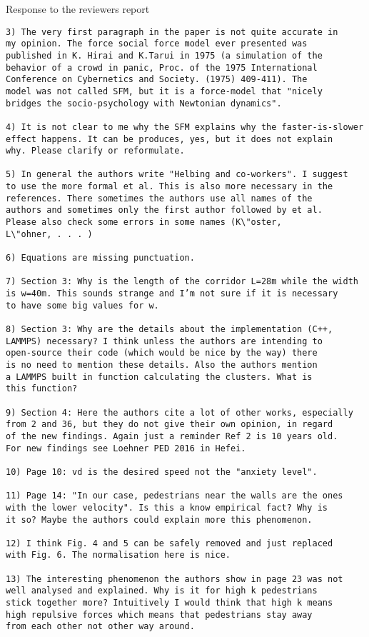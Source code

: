 \documentclass[a4paper,12pt]{letter}
\begin{document}
\begin{letter}{Response to the reviewers report}
\begin{verbatim}
3) The very first paragraph in the paper is not quite accurate in 
my opinion. The force social force model ever presented was 
published in K. Hirai and K.Tarui in 1975 (a simulation of the 
behavior of a crowd in panic, Proc. of the 1975 International 
Conference on Cybernetics and Society. (1975) 409-411). The 
model was not called SFM, but it is a force-model that "nicely 
bridges the socio-psychology with Newtonian dynamics".

4) It is not clear to me why the SFM explains why the faster-is-slower 
effect happens. It can be produces, yes, but it does not explain 
why. Please clarify or reformulate.

5) In general the authors write "Helbing and co-workers". I suggest 
to use the more formal et al. This is also more necessary in the 
references. There sometimes the authors use all names of the 
authors and sometimes only the first author followed by et al. 
Please also check some errors in some names (K\"oster, 
L\"ohner, . . . )

6) Equations are missing punctuation.

7) Section 3: Why is the length of the corridor L=28m while the width 
is w=40m. This sounds strange and I’m not sure if it is necessary 
to have some big values for w.

8) Section 3: Why are the details about the implementation (C++, 
LAMMPS) necessary? I think unless the authors are intending to 
open-source their code (which would be nice by the way) there 
is no need to mention these details. Also the authors mention 
a LAMMPS built in function calculating the clusters. What is
this function?

9) Section 4: Here the authors cite a lot of other works, especially 
from 2 and 36, but they do not give their own opinion, in regard 
of the new findings. Again just a reminder Ref 2 is 10 years old. 
For new findings see Loehner PED 2016 in Hefei.

10) Page 10: vd is the desired speed not the "anxiety level".

11) Page 14: "In our case, pedestrians near the walls are the ones 
with the lower velocity". Is this a know empirical fact? Why is 
it so? Maybe the authors could explain more this phenomenon. 

12) I think Fig. 4 and 5 can be safely removed and just replaced 
with Fig. 6. The normalisation here is nice.

13) The interesting phenomenon the authors show in page 23 was not 
well analysed and explained. Why is it for high k pedestrians 
stick together more? Intuitively I would think that high k means 
high repulsive forces which means that pedestrians stay away 
from each other not other way around.


\end{verbatim}
\end{letter}
\end{document}
